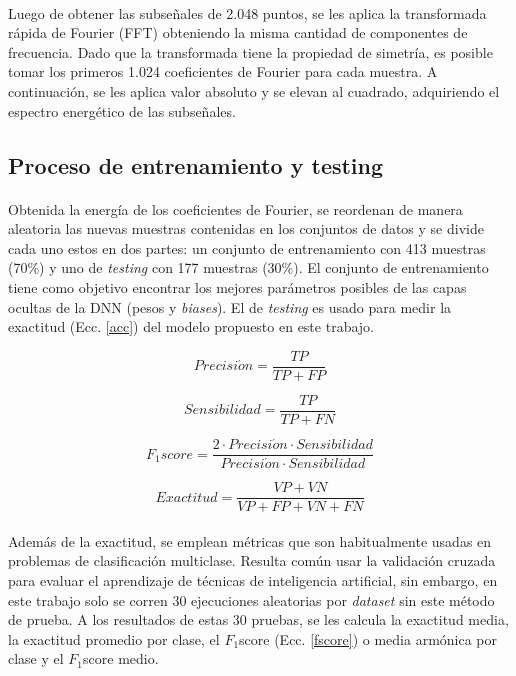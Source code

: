 \documentclass[12pt]{article}
\begin{document}
\paragraph{}
Luego de obtener las subseñales de 2.048 puntos, se les aplica la transformada rápida de Fourier (FFT) obteniendo la misma cantidad de componentes de frecuencia. Dado que la transformada tiene la propiedad de simetría, es posible tomar los primeros 1.024 coeficientes de Fourier para cada muestra. A continuación, se les aplica valor absoluto y se elevan al cuadrado, adquiriendo el espectro energético de las subseñales.

\subsection{Proceso de entrenamiento y testing}
\paragraph{}
Obtenida la energía de los coeficientes de Fourier, se reordenan de manera aleatoria las nuevas muestras contenidas en los conjuntos de datos y se divide cada uno estos en dos partes: un conjunto de entrenamiento con 413 muestras (70\%) y uno de \textit{testing} con 177 muestras (30\%). El conjunto de entrenamiento tiene como objetivo encontrar los mejores parámetros posibles de las capas ocultas de la DNN (pesos y \textit{biases}). El de \textit{testing} es usado para medir la exactitud (Ecc. \ref{acc}) del modelo propuesto en este trabajo.

\begin{equation}
\label{precision}
Precisi\acute{o}n = \frac{TP}{TP+FP}
\end{equation}

\begin{equation}
\label{sensibilidad}
Sensibilidad = \frac{TP}{TP+FN}
\end{equation}

\begin{equation}
\label{fscore}
F_{1}score = \frac{2\cdot{Precisi\acute{o}n}\cdot{Sensibilidad}}{Precisi\acute{o}n\cdot{Sensibilidad}}
\end{equation}

\begin{equation}
\label{acc}
Exactitud = \frac{VP+VN}{VP+FP+VN+FN}
\end{equation} 

\paragraph{}
Además de la exactitud, se emplean métricas que son habitualmente usadas en problemas de clasificación multiclase. Resulta común usar la validación cruzada para evaluar el aprendizaje de técnicas de inteligencia artificial, sin embargo, en este trabajo solo se corren 30 ejecuciones aleatorias por \textit{dataset} sin este método de prueba. A los resultados de estas 30 pruebas, se les calcula la exactitud media, la exactitud promedio por clase, el $F_{1}$score (Ecc. \ref{fscore}) o media armónica por clase y el $F_{1}$score medio.
\end{document}
